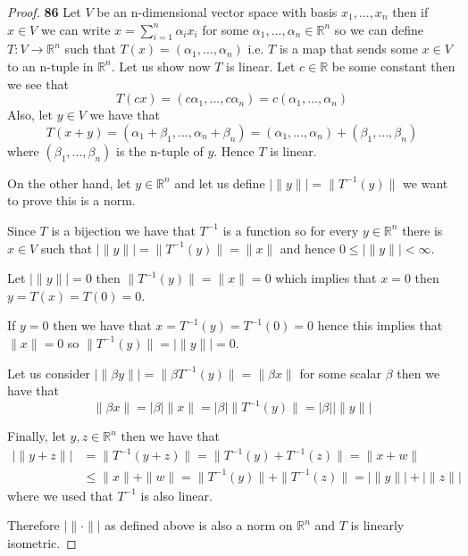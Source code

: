 \documentclass[11pt]{article}
\newcommand{\R}{\mathbb{R}}
\theoremstyle{definition}
\begin{document}
    \begin{proof}{\textbf{86}}
        Let $V$ be an n-dimensional vector space with basis $x_1, . . . ,x_n$
        then if $x \in V$ we can write $x = \sum_{i=1}^n \alpha_i x_i$ for some
        $\alpha_1, ..., \alpha_n \in \R^n$ so we can define $T: V \to \R^n$
        such that $T(x) = (\alpha_1, ..., \alpha_n)$ i.e. $T$ is a map that
        sends some $x \in V$ to an n-tuple in $\R^n$. Let us show now $T$
        is linear. Let $c \in \R$ be some constant then we see that
        $$T(cx) = (c\alpha_1, ..., c\alpha_n) = c(\alpha_1, ..., \alpha_n)$$
        Also, let $y \in V$ we have that
        $$T(x + y) = (\alpha_1 + \beta_1, ..., \alpha_n + \beta_n)
        = (\alpha_1, ..., \alpha_n) + (\beta_1, ..., \beta_n)$$
        where $(\beta_1, ..., \beta_n)$ is the n-tuple of $y$.
        Hence $T$ is linear.

        On the other hand, let $y \in \R^n$ and let us define
        $|\|y\|| = \|T^{-1}(y)\|$ we want to prove this is a norm.
        
        Since $T$ is a bijection we have that $T^{-1}$ is a function
        so for every $y \in \R^n$ there is $x \in V$ such that 
        $|\|y\|| = \|T^{-1}(y)\| = \|x\|$ and hence $0 \leq |\|y\|| < \infty$.
        
        Let $|\|y\|| = 0$ then $\|T^{-1}(y)\| = \|x\| = 0$ which implies that
        $x = 0$ then $y = T(x) = T(0) = 0$.
        
        If $y = 0$ then we have that $x = T^{-1}(y) = T^{-1}(0) = 0$ hence 
        this implies that $\|x\| = 0 $ so $\|T^{-1}(y)\| = |\|y\|| = 0$.

        Let us consider $|\|\beta y\|| = \|\beta T^{-1}(y)\| = \|\beta x\|$
        for some scalar $\beta$ then we have that
        $$\|\beta x\| = |\beta|\|x\| = |\beta| \|T^{-1}(y)\| = |\beta||\|y\||$$

        Finally, let $y,z \in \R^{n}$ then we have that        
        \begin{align*}
            |\|y + z\|| &= \|T^{-1}(y + z)\| = \|T^{-1}(y) + T^{-1}(z)\|
            = \|x + w\|\\
                &\leq \|x\| + \|w\| = \|T^{-1}(y)\| + \|T^{-1}(z)\|
            = |\|y\|| + |\|z\||
        \end{align*}
        where we used that $T^{-1}$ is also linear.

        Therefore $|\|\cdot\||$ as defined above is also a norm on $\R^{n}$ and
        $T$ is linearly isometric.
    \end{proof}
\end{document}

